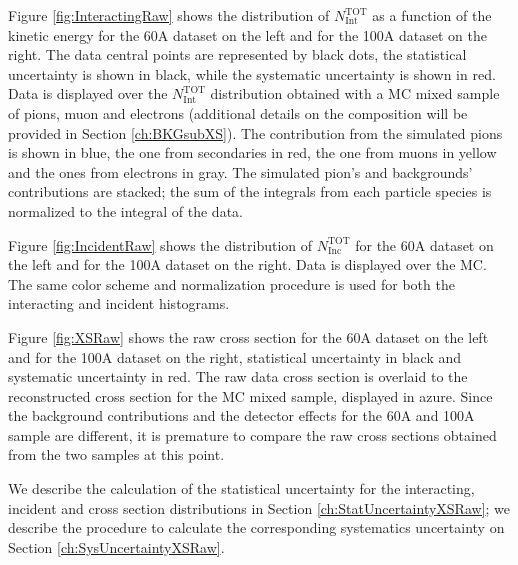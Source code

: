 Figure \ref{fig:InteractingRaw} shows the distribution of  $N^{\text{TOT}}_{\text{Int}}$  as a function of the kinetic energy for the 60A dataset on the left and for the 100A dataset on the right. The data central points are represented by black dots, the statistical uncertainty is shown in black, while the systematic uncertainty is shown in red. Data is displayed over the $N^{\text{TOT}}_{\text{Int}}$  distribution obtained with a MC mixed sample of pions, muon and electrons (additional details on the composition will be provided in Section \ref{ch:BKGsubXS}). The contribution from the simulated pions is shown in blue, the one from secondaries in red, the one from muons in yellow and the ones from electrons in gray. 
The simulated pion's and backgrounds' contributions are stacked; the sum of the integrals from each particle species is normalized to the integral of the data.
 
Figure \ref{fig:IncidentRaw} shows the distribution of  $N^{\text{TOT}}_{\text{Inc}}$   for the 60A dataset on the left and for the 100A dataset on the right. Data is displayed over the MC. The same color scheme and normalization procedure is used for both the interacting and incident histograms. 


Figure \ref{fig:XSRaw} shows the raw cross section for the 60A dataset on the left and for the 100A dataset on the right, statistical uncertainty in black and systematic uncertainty in red. The raw data cross section is overlaid to the reconstructed cross section for the MC mixed sample, displayed in azure. Since the background contributions and the detector effects for the 60A and 100A sample are different, it is premature to compare the raw cross sections obtained from the two samples at this point.

We describe the calculation of the statistical uncertainty for the interacting, incident and cross section distributions in Section \ref{ch:StatUncertaintyXSRaw}; we describe the procedure to calculate the corresponding systematics uncertainty on Section \ref{ch:SysUncertaintyXSRaw}.

